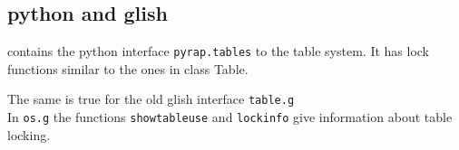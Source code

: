 \subsection{python and glish}
contains the python interface \texttt{pyrap.tables} to the table system.
It has lock functions similar to the ones in class Table.

The same is true for the old glish interface \texttt{table.g}
\\In \texttt{os.g} the functions \texttt{showtableuse} and
\texttt{lockinfo} give information about table locking.
